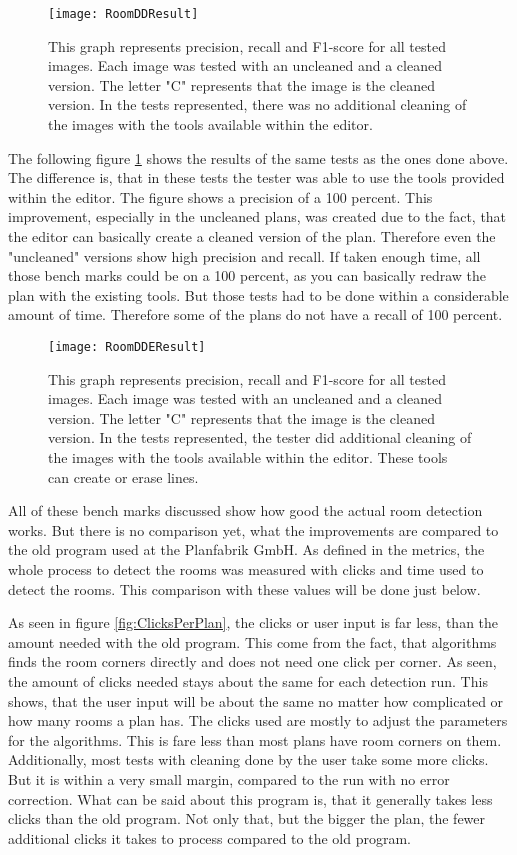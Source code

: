 \begin{figure}[H]
	\centering
	\texttt{[image: RoomDDResult]}
	\caption{This graph represents precision, recall and F1-score for all tested images. Each image was tested with an uncleaned and a cleaned version. The letter "C" represents that the image is the cleaned version. In the tests represented, there was no additional cleaning of the images with the tools available within the editor. }
	\label{fig:RoomDDResult}
\end{figure}

The following figure \ref{fig:RoomDDResult} shows the results of the same tests as the ones done above. The difference is, that in these tests the tester was able to use the tools provided within the editor. The figure shows a precision of a 100 percent. This improvement, especially in the uncleaned plans, was created due to the fact, that the editor can basically create a cleaned version of the plan. Therefore even the "uncleaned" versions show high precision and recall. If taken enough time, all those bench marks could be on a 100 percent, as you can basically redraw the plan with the existing tools. But those tests had to be done within a considerable amount of time. Therefore some of the plans do not have a recall of 100 percent.

\begin{figure}[H]
	\centering
	\texttt{[image: RoomDDEResult]}
	\caption{This graph represents precision, recall and F1-score for all tested images. Each image was tested with an uncleaned and a cleaned version. The letter "C" represents that the image is the cleaned version. In the tests represented, the tester did additional cleaning of the images with the tools available within the editor. These tools can create or erase lines. }
	\label{fig:RoomDDEResult}
\end{figure}

All of these bench marks discussed show how good the actual room detection works. But there is no comparison yet, what the improvements are compared to the old program used at the Planfabrik GmbH. As defined in the metrics, the whole process to detect the rooms was measured with clicks and time used to detect the rooms. This comparison with these values will be done just below.

As seen in figure \ref{fig:ClicksPerPlan}, the clicks or user input is far less, than the amount needed with the old program. This come from the fact, that algorithms finds the room corners directly and does not need one click per corner. As seen, the amount of clicks needed stays about the same for each detection run. This shows, that the user input will be about the same no matter how complicated or how many rooms a plan has. The clicks used are mostly to adjust the parameters for the algorithms. This is fare less than most plans have room corners on them. Additionally, most tests with cleaning done by the user take some more clicks. But it is within a very small margin, compared to the run with no error correction. What can be said about this program is, that it generally takes less clicks than the old program. Not only that, but the bigger the plan, the fewer additional clicks it takes to process compared to the old program. 

